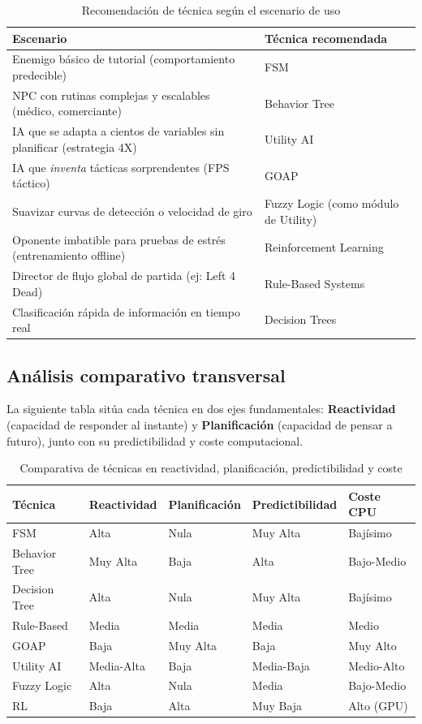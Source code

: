 \documentclass[12pt,letterpaper]{article}
\begin{document}
\begin{table}[H]
\centering
\caption{Recomendación de técnica según el escenario de uso}
\small
\begin{tabularx}{\textwidth}{L{3.8cm}Y}
\toprule
\textbf{Escenario} & \textbf{Técnica recomendada} \\
\midrule
Enemigo básico de tutorial (comportamiento predecible) & FSM \\
NPC con rutinas complejas y escalables (médico, comerciante) & Behavior Tree \\
IA que se adapta a cientos de variables sin planificar (estrategia 4X) & Utility AI \\
IA que \textit{inventa} tácticas sorprendentes (FPS táctico) & GOAP \\
Suavizar curvas de detección o velocidad de giro & Fuzzy Logic (como módulo de Utility) \\
Oponente imbatible para pruebas de estrés (entrenamiento offline) & Reinforcement Learning \\
Director de flujo global de partida (ej: Left 4 Dead) & Rule-Based Systems \\
Clasificación rápida de información en tiempo real & Decision Trees \\
\bottomrule
\end{tabularx}
\end{table}

\subsection{Análisis comparativo transversal}

La siguiente tabla sitúa cada técnica en dos ejes fundamentales: \textbf{Reactividad} (capacidad de responder al instante) y \textbf{Planificación} (capacidad de pensar a futuro), junto con su predictibilidad y coste computacional.

\begin{table}[H]
\centering
\caption{Comparativa de técnicas en reactividad, planificación, predictibilidad y coste}
\small
\begin{tabularx}{\textwidth}{L{1.8cm}L{1.8cm}L{1.8cm}L{1.8cm}L{2cm}}
\toprule
\textbf{Técnica} & \textbf{Reactividad} & \textbf{Planificación} & \textbf{Predictibilidad} & \textbf{Coste CPU} \\
\midrule
FSM & Alta & Nula & Muy Alta & Bajísimo \\
Behavior Tree & Muy Alta & Baja & Alta & Bajo-Medio \\
Decision Tree & Alta & Nula & Muy Alta & Bajísimo \\
Rule-Based & Media & Media & Media & Medio \\
GOAP & Baja & Muy Alta & Baja & Muy Alto \\
Utility AI & Media-Alta & Baja & Media-Baja & Medio-Alto \\
Fuzzy Logic & Alta & Nula & Media & Bajo-Medio \\
RL & Baja & Alta & Muy Baja & Alto (GPU) \\
\bottomrule
\end{tabularx}
\end{table}
\end{document}
